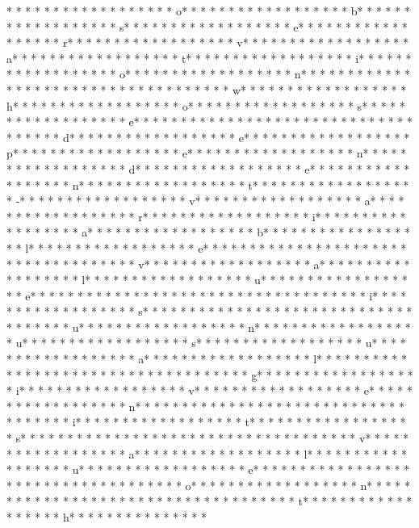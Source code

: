 * * *  * * *  * * *  *  * * *  *  * * *  * o* * *  * * *  * * *  *  * * *  *  * * *  * b* * *  * * *  * * *  *  * * *  *  * * *  * s* * *  * * *  * * *  *  * * *  *  * * *  * e* * *  * * *  * * *  *  * * *  *  * * *  * r* * *  * * *  * * *  *  * * *  *  * * *  * v* * *  * * *  * * *  *  * * *  *  * * *  * a* * *  * * *  * * *  *  * * *  *  * * *  * t* * *  * * *  * * *  *  * * *  *  * * *  * i* * *  * * *  * * *  *  * * *  *  * * *  * o* * *  * * *  * * *  *  * * *  *  * * *  * n* * *  * * *  * * *  *  * * *  *  * * *  *  * * *  * * *  * * *  *  * * *  *  * * *  * w* * *  * * *  * * *  *  * * *  *  * * *  * h* * *  * * *  * * *  *  * * *  *  * * *  * o* * *  * * *  * * *  *  * * *  *  * * *  * s* * *  * * *  * * *  *  * * *  *  * * *  * e* * *  * * *  * * *  *  * * *  *  * * *  *  * * *  * * *  * * *  *  * * *  *  * * *  * d* * *  * * *  * * *  *  * * *  *  * * *  * e* * *  * * *  * * *  *  * * *  *  * * *  * p* * *  * * *  * * *  *  * * *  *  * * *  * e* * *  * * *  * * *  *  * * *  *  * * *  * n* * *  * * *  * * *  *  * * *  *  * * *  * d* * *  * * *  * * *  *  * * *  *  * * *  * e* * *  * * *  * * *  *  * * *  *  * * *  * n* * *  * * *  * * *  *  * * *  *  * * *  * t* * *  * * *  * * *  *  * * *  *  * * *  * -* * *  * * *  * * *  *  * * *  *  * * *  * v* * *  * * *  * * *  *  * * *  *  * * *  * a* * *  * * *  * * *  *  * * *  *  * * *  * r* * *  * * *  * * *  *  * * *  *  * * *  * i* * *  * * *  * * *  *  * * *  *  * * *  * a* * *  * * *  * * *  *  * * *  *  * * *  * b* * *  * * *  * * *  *  * * *  *  * * *  * l* * *  * * *  * * *  *  * * *  *  * * *  * e* * *  * * *  * * *  *  * * *  *  * * *  *  * * *  * * *  * * *  *  * * *  *  * * *  * v* * *  * * *  * * *  *  * * *  *  * * *  * a* * *  * * *  * * *  *  * * *  *  * * *  * l* * *  * * *  * * *  *  * * *  *  * * *  * u* * *  * * *  * * *  *  * * *  *  * * *  * e* * *  * * *  * * *  *  * * *  *  * * *  *  * * *  * * *  * * *  *  * * *  *  * * *  * i* * *  * * *  * * *  *  * * *  *  * * *  * s* * *  * * *  * * *  *  * * *  *  * * *  *  * * *  * * *  * * *  *  * * *  *  * * *  * u* * *  * * *  * * *  *  * * *  *  * * *  * n* * *  * * *  * * *  *  * * *  *  * * *  * u* * *  * * *  * * *  *  * * *  *  * * *  * s* * *  * * *  * * *  *  * * *  *  * * *  * u* * *  * * *  * * *  *  * * *  *  * * *  * a* * *  * * *  * * *  *  * * *  *  * * *  * l* * *  * * *  * * *  *  * * *  *  * * *  *  * * *  * * *  * * *  *  * * *  *  * * *  * g* * *  * * *  * * *  *  * * *  *  * * *  * i* * *  * * *  * * *  *  * * *  *  * * *  * v* * *  * * *  * * *  *  * * *  *  * * *  * e* * *  * * *  * * *  *  * * *  *  * * *  * n* * *  * * *  * * *  *  * * *  *  * * *  *  * * *  * * *  * * *  *  * * *  *  * * *  * i* * *  * * *  * * *  *  * * *  *  * * *  * t* * *  * * *  * * *  *  * * *  *  * * *  * s* * *  * * *  * * *  *  * * *  *  * * *  *  * * *  * * *  * * *  *  * * *  *  * * *  * v* * *  * * *  * * *  *  * * *  *  * * *  * a* * *  * * *  * * *  *  * * *  *  * * *  * l* * *  * * *  * * *  *  * * *  *  * * *  * u* * *  * * *  * * *  *  * * *  *  * * *  * e* * *  * * *  * * *  *  * * *  *  * * *  *  * * *  * * *  * * *  *  * * *  *  * * *  * o* * *  * * *  * * *  *  * * *  *  * * *  * n* * *  * * *  * * *  *  * * *  *  * * *  *  * * *  * * *  * * *  *  * * *  *  * * *  * t* * *  * * *  * * *  *  * * *  *  * * *  * h* * *  * * *  * * *  *  * * *  *  * 